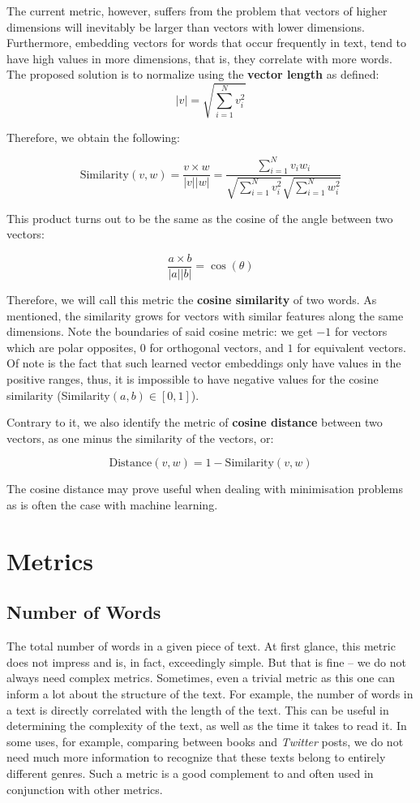 The current metric, however, suffers from the problem that vectors of higher dimensions will inevitably be larger than vectors with lower dimensions. Furthermore, embedding vectors for words that occur frequently in text, tend to have high values in more dimensions, that is, they correlate with more words. The proposed solution is to normalize using the \textbf{vector length} as defined:
$$ | v| = \sqrt{\sum_{i=1}^{N}v_i^2}$$

Therefore, we obtain the following:

$$ \text{Similarity} (v, w) = \frac{v \times w}{|v| |w|} = \frac{\sum_{i=1}^{N} v_i w_i}{\sqrt{\sum_{i=1}^{N}v_i^2} \sqrt{\sum_{i=1}^{N}w_i^2}}$$

This product turns out to be the same as the cosine of the angle between two vectors:

$$ \frac{a \times b}{|a| |b|} = \cos(\theta) $$

Therefore, we will call this metric the \textbf{cosine similarity} of two words. As mentioned, the similarity grows for vectors with similar features along the same dimensions. Note the boundaries of said cosine metric: we get $-1$ for vectors which are polar opposites, $0$ for orthogonal vectors, and $1$ for equivalent vectors. Of note is the fact that such learned vector embeddings only have values in the positive ranges, thus, it is impossible to have negative values for the cosine similarity (Similarity$(a,b) \in [0,1]$).

Contrary to it, we also identify the metric of \textbf{cosine distance} between two vectors, as one minus the similarity of the vectors, or:

$$ \text{Distance}(v,w) = 1 - \text{Similarity}(v,w) $$

The cosine distance may prove useful when dealing with minimisation problems as is often the case with machine learning.

\section{Metrics}
\label{sec:metrics}

\subsection{Number of Words}
The total number of words in a given piece of text. At first glance, this metric does not impress and is, in fact, exceedingly simple. But that is fine -- we do not always need complex metrics. Sometimes, even a trivial metric as this one can inform a lot about the structure of the text. For example, the number of words in a text is directly correlated with the length of the text. This can be useful in determining the complexity of the text, as well as the time it takes to read it. In some uses, for example, comparing between books and \textit{Twitter} posts, we do not need much more information to recognize that these texts belong to entirely different genres. Such a metric is a good complement to and often used in conjunction with other metrics.

